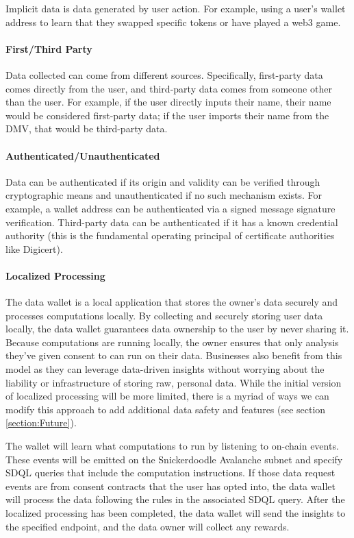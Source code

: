 Implicit data is data generated by user action. For example, using a user's wallet address to learn that they swapped specific tokens or have played a web3 game. 


\paragraph{First/Third Party}
Data collected can come from different sources. Specifically, first-party data comes directly from the user, and third-party data comes from 
someone other than the user. For example, if the user directly inputs their name, their name would be considered first-party data; if the 
user imports their name from the DMV, that would be third-party data.


\paragraph{Authenticated/Unauthenticated}
Data can be authenticated if its origin and validity can be verified through cryptographic means and unauthenticated if no such mechanism exists. For example, 
a wallet address can be authenticated via a signed message signature verification. Third-party data can be authenticated if it has a known 
credential authority (this is the fundamental operating principal of certificate authorities like Digicert). 

\paragraph{Localized Processing} %

The data wallet is a local application that stores the owner's data securely and processes computations locally. By collecting and 
securely storing user data locally, the data wallet guarantees data ownership to the user by never sharing it. Because computations 
are running locally, the owner ensures that only analysis they've given consent to can run on their data. Businesses also benefit 
from this model as they can leverage data-driven insights without worrying about the liability or infrastructure of storing raw, 
personal data. While the initial version of localized processing will be more limited, there is a myriad of ways we can modify this 
approach to add additional data safety and features (see section \ref{section:Future}). 

The wallet will learn what computations to run by listening to on-chain events. These events will be emitted on the Snickerdoodle Avalanche 
subnet and specify SDQL queries that include the computation instructions. If those data request events are from consent contracts that the 
user has opted into, the data wallet will process the data following the rules in the associated SDQL query. After the localized processing 
has been completed, the data wallet will send the insights to the specified endpoint, and the data owner will collect any rewards.


